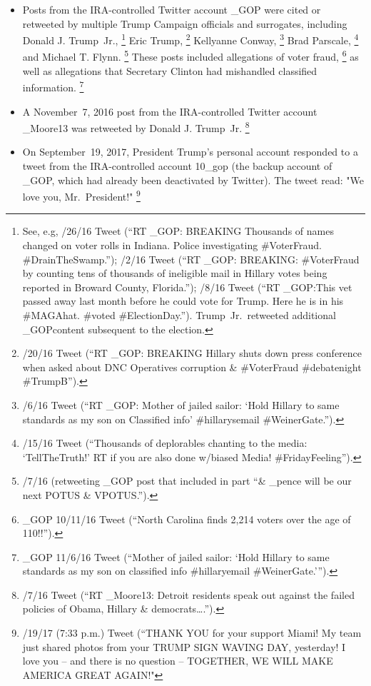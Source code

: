 \begin{itemize}
    \item Posts from the IRA-controlled Twitter account \@TEN\_GOP were cited or retweeted by multiple Trump Campaign officials and surrogates, including Donald J. Trump~Jr.,%
    \footnote{See, e.g, /26/16 Tweet (``RT \@TEN\_GOP: BREAKING Thousands of names changed on voter rolls in Indiana.
    Police investigating \#VoterFraud. \#DrainTheSwamp.'');
    /2/16 Tweet (``RT \@TEN\_GOP: BREAKING: \#VoterFraud by counting tens of thousands of ineligible mail in Hillary votes being reported in Broward County, Florida.'');
    /8/16 Tweet (``RT \@TEN\_GOP:This vet passed away last month before he could vote for Trump.
    Here he is in his \#MAGAhat.
    \#voted \#ElectionDay.''). Trump~Jr.\ retweeted additional \@TEN\_GOPcontent subsequent to the election.}
    Eric Trump,%
    \footnote{/20/16 Tweet (``RT \@TEN\_GOP: BREAKING Hillary shuts down press conference when asked about DNC Operatives corruption \& \#VoterFraud \#debatenight \#TrumpB'').}
    Kellyanne Conway,%
    \footnote{/6/16 Tweet (``RT \@TEN\_GOP: Mother of jailed sailor: `Hold Hillary to same standards as my son on Classified info' \#hillarysemail \#WeinerGate.'').}
    Brad Parscale,%
    \footnote{/15/16 Tweet (``Thousands of deplorables chanting to the media: `TellTheTruth!' RT if you are also done w/biased Media! \#FridayFeeling'').}
    and Michael T. Flynn.%
    \footnote{/7/16 (retweeting \@TEN\_GOP post that included in part ``\@realDonaldTrump \& \@mike\_pence will be our next POTUS \& VPOTUS.'').}
    These posts included allegations of voter fraud,%
    \footnote{\@TEN\_GOP 10/11/16 Tweet (``North Carolina finds 2,214 voters over the age of 110!!'').}
    as well as allegations that Secretary Clinton had mishandled classified information.%
		\footnote{\@TEN\_GOP 11/6/16 Tweet (``Mother of jailed sailor: `Hold Hillary to same standards as my son on classified info \#hillaryemail \#WeinerGate.'{}'').}
    \item A November~7, 2016 post from the IRA-controlled Twitter account \@Pamela\_Moore13 was retweeted by Donald J. Trump~Jr.%
    \footnote{/7/16 Tweet (``RT \@Pamela\_Moore13: Detroit residents speak out against the failed policies of Obama, Hillary \& democrats\dots.'').}
    \item On September~19, 2017, President Trump's personal account \@realDonaldTrump responded to a tweet from the IRA-controlled account \@10\_gop (the backup account of \@TEN\_GOP, which had already been deactivated by Twitter). The tweet read: "We love you, Mr.~President!"%
    \footnote{/19/17 (7:33 p.m.) Tweet (``THANK YOU for your support Miami! My team just shared photos from your TRUMP SIGN WAVING DAY, yesterday! I love you -- and there is no question -- TOGETHER, WE WILL MAKE AMERICA GREAT AGAIN!"}
\end{itemize}


